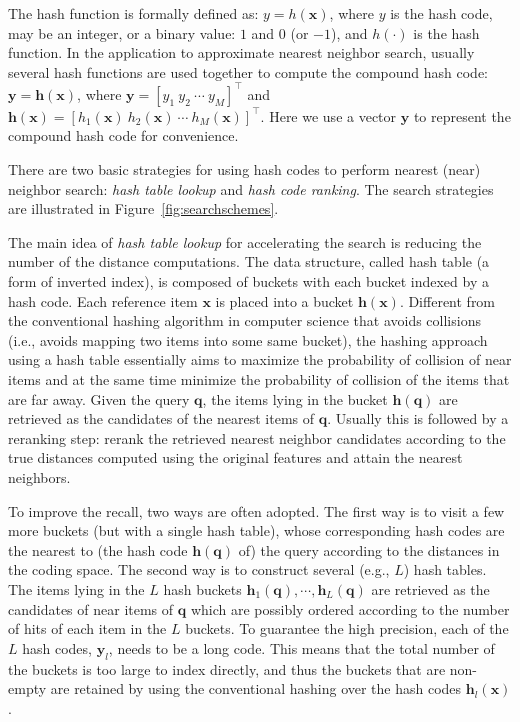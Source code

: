 \documentclass[10pt,journal,compsoc]{IEEEtran}
\begin{document}
The hash function is formally defined as:
$y = h(\mathbf{x})$,
where $y$ is the hash code,
may be an integer, or a binary value:
$1$ and $0$ (or $-1$),
and $h(\cdot)$ is the hash function.
In the application
to approximate nearest neighbor search,
usually several hash functions are used
together
to compute the compound hash code:
$\mathbf{y} = \mathbf{h}(\mathbf{x})$,
where $\mathbf{y} = [y_1~y_2~\cdots~y_M]^\top$
and $\mathbf{h}(\mathbf{x})= [h_1(\mathbf{x})~h_2(\mathbf{x})~\cdots~h_M(\mathbf{x})]^\top$.
Here we use a vector $\mathbf{y}$
to represent the compound hash code
for convenience.

There are two basic strategies for
using hash codes to perform
nearest (near) neighbor search:
\emph{hash table lookup}
and \emph{hash code ranking}.
The search strategies are illustrated
in Figure~\ref{fig:searchschemes}.

The main idea of \emph{hash table lookup} for accelerating the search
is reducing the number of the distance computations.
The data structure,
called hash table
(a form of inverted index),
is composed of buckets
with each bucket indexed by a hash code.
Each reference item $\mathbf{x}$ is placed
into a bucket $\mathbf{h}(\mathbf{x})$.
Different from the conventional hashing algorithm
in computer science
that avoids collisions
(i.e., avoids mapping two items
into some same bucket),
the hashing approach using a hash table
essentially aims to maximize the probability
of collision of near items
and at the same time minimize
the probability of collision
of the items that are far away.
Given the query $\mathbf{q}$,
the items lying in the bucket $\mathbf{h}(\mathbf{q})$
are retrieved as the candidates of the nearest items of $\mathbf{q}$.
Usually this is followed by
a reranking step:
rerank the retrieved nearest neighbor candidates
according to the true distances
computed using the original features
and attain the nearest neighbors.

To improve the recall,
two ways are often adopted.
The first way is
to visit a few more buckets (but with a single hash table),
whose corresponding hash codes
are the nearest to (the hash code $\mathbf{h}(\mathbf{q})$ of) the query
according to the distances in the coding space.
The second way is to construct several (e.g., $L$) hash tables.
The items lying in the $L$ hash buckets
$\mathbf{h}_1(\mathbf{q}), \cdots, \mathbf{h}_L(\mathbf{q})$
are retrieved
as the candidates of near items of $\mathbf{q}$
which are possibly ordered according to the number of hits
of each item in the $L$ buckets.
To guarantee the high precision,
each of the $L$ hash codes, $\mathbf{y}_l$,
needs to be a long code.
This means that
the total number of the buckets is too large
to index directly,
and thus
the buckets that are non-empty are retained
by using the conventional hashing over the hash codes
$\mathbf{h}_l(\mathbf{x})$.
\end{document}
